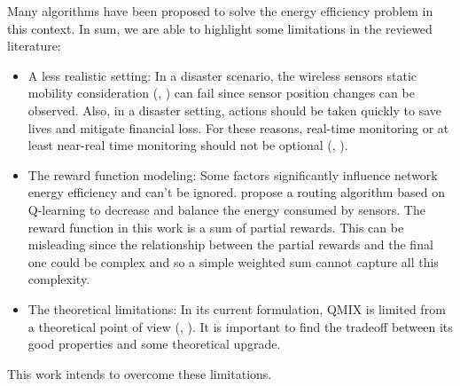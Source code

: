 Many algorithms have been proposed to solve the energy efficiency problem in this context. In sum, we are able to highlight some limitations in the reviewed literature:

\begin{itemize}
    \item A less realistic setting: In a disaster scenario, the wireless sensors static mobility consideration (\cite{priyanga_energy_2018}, \cite{mr_holistic_2023}) can fail since sensor position changes can be observed. Also, in a disaster setting, actions should be taken quickly to save lives and mitigate financial loss. For these reasons, real-time monitoring or at least near-real time monitoring should not be optional (\cite{maheshwari_energy_2021}, \cite{abualigah_swarm_2023}).
    \item The reward function modeling: Some factors significantly influence network energy efficiency and can’t be ignored. \cite{su_q-learning-based_2023} propose a routing algorithm based on Q-learning to decrease and balance the energy consumed by sensors. The reward function in this work is a sum of partial rewards. This can be misleading since the relationship between the partial rewards and the final one could be complex and so a simple weighted sum cannot capture all this complexity.
    \item The theoretical limitations: In its current formulation, QMIX is limited from a theoretical point of view (\cite{ding_packet_2022}, \cite{noauthor_multi-agent_nodate}). It is important to find the tradeoff between its good properties and some theoretical upgrade.
\end{itemize}
This work intends to overcome these limitations. 
